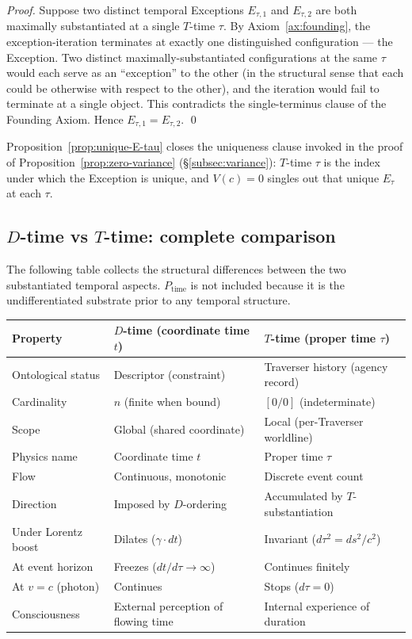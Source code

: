 \documentclass[11pt,a4paper]{article}
\theoremstyle{definition}
\theoremstyle{remark}
\begin{document}
\begin{proof}
Suppose two distinct temporal Exceptions $E_{\tau,1}$ and $E_{\tau,2}$ are both maximally substantiated at a single $T$-time $\tau$. By Axiom~\ref{ax:founding}, the exception-iteration terminates at exactly one distinguished configuration --- the Exception. Two distinct maximally-substantiated configurations at the same $\tau$ would each serve as an ``exception'' to the other (in the structural sense that each could be otherwise with respect to the other), and the iteration would fail to terminate at a single object. This contradicts the single-terminus clause of the Founding Axiom. Hence $E_{\tau,1} = E_{\tau,2}$. \qed
\end{proof}

Proposition~\ref{prop:unique-E-tau} closes the uniqueness clause invoked in the proof of Proposition~\ref{prop:zero-variance} (\S\ref{subsec:variance}): $T$-time $\tau$ is the index under which the Exception is unique, and $V(c) = 0$ singles out that unique $E_{\tau}$ at each $\tau$.

\subsection{$D$-time vs $T$-time: complete comparison}\label{subsec:time-comparison}

The following table collects the structural differences between the two substantiated temporal aspects. $P_{\text{time}}$ is not included because it is the undifferentiated substrate prior to any temporal structure.

\begin{center}
\small
\begin{tabular}{@{}lll@{}}
\toprule
\textbf{Property} & \textbf{$D$-time (coordinate time $t$)} & \textbf{$T$-time (proper time $\tau$)} \\
\midrule
Ontological status & Descriptor (constraint) & Traverser history (agency record) \\
Cardinality & $n$ (finite when bound) & $[0/0]$ (indeterminate) \\
Scope & Global (shared coordinate) & Local (per-Traverser worldline) \\
Physics name & Coordinate time $t$ & Proper time $\tau$ \\
Flow & Continuous, monotonic & Discrete event count \\
Direction & Imposed by $D$-ordering & Accumulated by $T$-substantiation \\
Under Lorentz boost & Dilates ($\gamma \cdot dt$) & Invariant ($d\tau^{2} = ds^{2}/c^{2}$) \\
At event horizon & Freezes ($dt/d\tau \to \infty$) & Continues finitely \\
At $v = c$ (photon) & Continues & Stops ($d\tau = 0$) \\
Consciousness & External perception of flowing time & Internal experience of duration \\
\bottomrule
\end{tabular}
\end{center}
\end{document}
